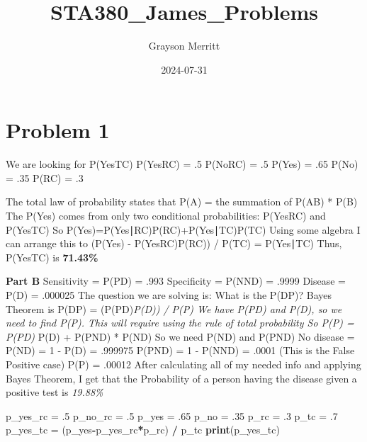 \documentclass[
]{article}
\title{STA380\_James\_Problems}
\author{Grayson Merritt}
\date{2024-07-31}
\newenvironment{Shaded}{\begin{snugshade}}{\end{snugshade}}
\newcommand{\DecValTok}[1]{\textcolor[rgb]{0.00,0.00,0.81}{#1}}
\newcommand{\FunctionTok}[1]{\textcolor[rgb]{0.13,0.29,0.53}{\textbf{#1}}}
\newcommand{\NormalTok}[1]{#1}
\newcommand{\OtherTok}[1]{\textcolor[rgb]{0.56,0.35,0.01}{#1}}
\newcommand{\SpecialCharTok}[1]{\textcolor[rgb]{0.81,0.36,0.00}{\textbf{#1}}}
\begin{document}
\maketitle

\section{Problem 1}\label{problem-1}

We are looking for P(Yes\textbar TC) P(Yes\textbar RC) = .5
P(No\textbar RC) = .5 P(Yes) = .65 P(No) = .35 P(RC) = .3

The total law of probability states that P(A) = the summation of
P(A\textbar B) * P(B) The P(Yes) comes from only two conditional
probabilities: P(Yes\textbar RC) and P(Yes\textbar TC) So
P(Yes)=P(Yes∣RC)P(RC)+P(Yes∣TC)P(TC) Using some algebra I can arrange
this to (P(Yes) - P(Yes\textbar RC)P(RC)) / P(TC) = P(Yes∣TC) Thus,
P(Yes\textbar TC) is \textbf{71.43\%}

\textbf{Part B} Sensitivity = P(P\textbar D) = .993 Specificity =
P(N\textbar ND) = .9999 Disease = P(D) = .000025 The question we are
solving is: What is the P(D\textbar P)? Bayes Theorem is P(D\textbar P)
= (P(P\textbar D)\emph{P(D)) / P(P) We have P(P\textbar D) and P(D), so
we need to find P(P). This will require using the rule of total
probability So P(P) = P(P\textbar D) } P(D) + P(P\textbar ND) * P(ND) So
we need P(ND) and P(P\textbar ND) No disease = P(ND) = 1 - P(D) =
.999975 P(P\textbar ND) = 1 - P(N\textbar ND) = .0001 (This is the False
Positive case) P(P) = .00012 After calculating all of my needed info and
applying Bayes Theorem, I get that the Probability of a person having
the disease given a positive test is \emph{19.88\%}

\begin{Shaded}
\begin{Highlighting}[]
\NormalTok{p\_yes\_rc }\OtherTok{=}\NormalTok{ .}\DecValTok{5}
\NormalTok{p\_no\_rc }\OtherTok{=}\NormalTok{ .}\DecValTok{5}
\NormalTok{p\_yes }\OtherTok{=}\NormalTok{ .}\DecValTok{65}
\NormalTok{p\_no }\OtherTok{=}\NormalTok{ .}\DecValTok{35}
\NormalTok{p\_rc }\OtherTok{=}\NormalTok{ .}\DecValTok{3}
\NormalTok{p\_tc }\OtherTok{=}\NormalTok{ .}\DecValTok{7}
\NormalTok{p\_yes\_tc }\OtherTok{=}\NormalTok{ (p\_yes}\SpecialCharTok{{-}}\NormalTok{p\_yes\_rc}\SpecialCharTok{*}\NormalTok{p\_rc) }\SpecialCharTok{/}\NormalTok{ p\_tc}
\FunctionTok{print}\NormalTok{(p\_yes\_tc)}
\end{Highlighting}
\end{Shaded}
\end{document}
